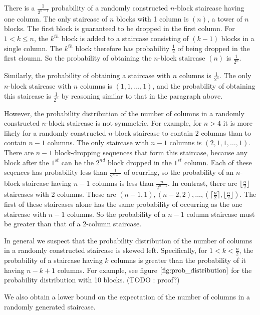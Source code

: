 \documentclass[12pt]{amsart}
\begin{document}
There is a $\frac{1}{2^{n-1}}$ probability of a randomly constructed $n$-block staircase having one column. The only staircase of $n$ blocks with 1 column is $(n)$, a tower of $n$ blocks. The first block is guaranteed to be dropped in the first column. For $1<k \leq n$, the $k^{th}$ block is added to a staircase consisting of $(k-1)$ blocks in a single column. The $k^{th}$ block therefore has probability $\frac{1}{2}$ of being dropped in the first cloumn. So the probability of obtaining the $n$-block staircase $(n)$ is $\frac{1}{2^n}$.

Similarly, the probability of obtaining a staircase with $n$ columns is $\frac{1}{2^{n}}$. The only $n$-block staircase with $n$ columns is $(1, 1, \ldots, 1)$, and the probability of obtaining this staircase is $\frac{1}{2^{n}}$ by reasoning similar to that in the paragraph above.

However, the probability distribution of the number of columns in a randomly constructed $n$-block staircase is not symmetric. For example, for $n > 4$ it is more likely for a randomly constructed $n$-block staircase to contain $2$ columns than to contain $n-1$ columns. The only staircase with $n-1$ columns is $(2, 1, 1, \ldots, 1)$. There are $n-1$ block-dropping sequences that form this staircase, because any block after the $1^{st}$ can be the $2^{nd}$ block dropped in the $1^{st}$ column. Each of these seqences has probability less than $\frac{1}{2^{n-1}}$ of ocurring, so the probability of an $n$-block staircase having $n-1$ columns is less than $\frac{n}{2^{n-1}}$.  In contrast, there are $\lfloor \frac{n}{2} \rfloor$ staircases with $2$ columns. These are $(n-1, 1), (n-2, 2), \ldots, (\lceil \frac{n}{2} \rceil, \lfloor \frac{n}{2} \rfloor)$. The first of these staircases alone has the same probability of occurring  as the one staircase with $n-1$ columns. So the probability of a $n-1$ column staircase must be greater than that of a $2$-column staircase.

In general we suspect that the probability distribution of the number of columns in a randomly constructed staircase is skewed left. Specifically, for $1 < k < \frac{n}{2}$, the probability of a staircase having $k$ columns is greater than the probability of it having $n-k+1$ columns. For example, see figure $\ref{fig:prob_distribution}$ for the probability distribution with 10 blocks. (TODO : proof?)

We also obtain a lower bound on the expectation of the number of columns in a randomly generated staircase.
\end{document}
